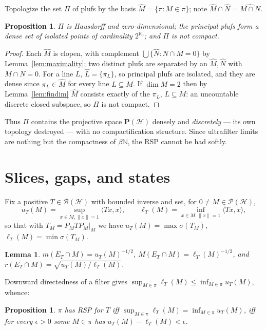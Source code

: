 \documentclass[11pt,reqno]{amsart}
\newtheorem{proposition}[theorem]{Proposition}
\newtheorem{lemma}[theorem]{Lemma}
\theoremstyle{definition}
\newcommand{\spec}{\sigma}
\newcommand{\Mm}{M}   %
\newcommand{\HH}{\mathcal{H}}
\newcommand{\PP}{\mathcal{P}}
\newcommand{\BH}{\mathcal{B}(\HH)}
\newcommand{\N}{\mathbb{N}}
\newcommand{\pluf}{\pi}
\begin{document}
Topologize the set $\Pi$ of plufs by the basis $\widehat M=\{\pluf:M\in\pluf\}$; note
$\widehat M\cap\widehat N=\widehat{M\cap N}$.

\begin{proposition}\label{prop:topology}
$\Pi$ is Hausdorff and zero-dimensional; the principal plufs form a dense set of isolated
points of cardinality $2^{\aleph_0}$; and $\Pi$ is not compact.
\end{proposition}

\begin{proof}
Each $\widehat M$ is clopen, with complement $\bigcup\{\widehat N:N\cap M=0\}$ by
Lemma~\ref{lem:maximality}; two distinct plufs are separated by an $\widehat M,\widehat N$
with $M\cap N=0$. For a line $L$, $\widehat L=\{\pluf_L\}$, so principal plufs are
isolated, and they are dense since $\pluf_L\in\widehat M$ for every line $L\subseteq M$.
If $\dim M=2$ then by Lemma~\ref{lem:findim} $\widehat M$ consists exactly of the
$\pluf_L$, $L\subseteq M$: an uncountable discrete closed subspace, so $\Pi$ is not
compact.
\end{proof}

Thus $\Pi$ contains the projective space $\mathbf P(\HH)$ densely and \emph{discretely} ---
its own topology destroyed --- with no compactification structure. Since ultrafilter
limits are nothing but the compactness of $\beta\N$, the RSP cannot be had softly.

\section{Slices, gaps, and states}\label{sec:slices}

Fix a positive $T\in\BH$ with bounded inverse and set, for $0\neq M\in\PP(\HH)$,
\[
u_T(M)=\sup_{x\in M,\|x\|=1}\langle Tx,x\rangle,\qquad
\ell_T(M)=\inf_{x\in M,\|x\|=1}\langle Tx,x\rangle,
\]
so that with $T_M=P_MTP_M|_M$ we have $u_T(M)=\max\spec(T_M)$,
$\ell_T(M)=\min\spec(T_M)$.

\begin{lemma}\label{lem:radii}
$m(E_T\cap M)=u_T(M)^{-1/2}$, $\Mm(E_T\cap M)=\ell_T(M)^{-1/2}$, and
$r(E_T\cap M)=\sqrt{u_T(M)/\ell_T(M)}$.
\end{lemma}

Downward directedness of a filter gives
$\sup_{M\in\pluf}\ell_T(M)\leq\inf_{M\in\pluf}u_T(M)$, whence:

\begin{proposition}\label{prop:gap}
$\pluf$ has RSP for $T$ iff
$\sup_{M\in\pluf}\ell_T(M)=\inf_{M\in\pluf}u_T(M)$, iff for every $\epsilon>0$ some
$M\in\pluf$ has $u_T(M)-\ell_T(M)<\epsilon$.
\end{proposition}
\end{document}
